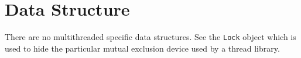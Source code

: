 \par
\section{Data Structure}
\label{section:MT:dataStructure}
\par
There are no multithreaded specific data structures.
See the {\tt Lock} object which is used to hide the 
particular mutual exclusion device used by a thread library.
